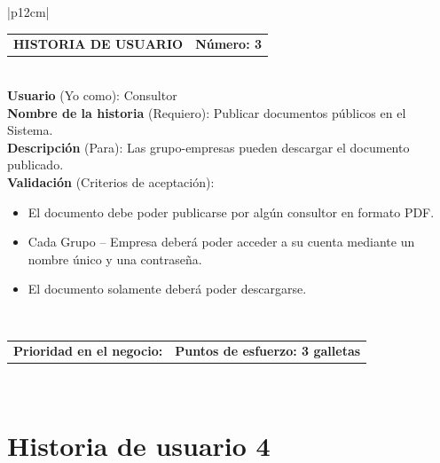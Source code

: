 \documentclass[11pt,letterpaper]{report}
\begin{document}
	\begin{center}	
	\begin{tabular}{|p{12cm}|}
		\hline
		\begin{tabular}{c|c}
			\textbf{HISTORIA DE USUARIO} & \textbf{Número: 3} \\
		\end{tabular} \\ \hline
		\textbf{Usuario} (Yo como): Consultor \\ \hline
		\textbf{Nombre de la historia} (Requiero): Publicar documentos públicos en el Sistema. \\ \hline
		\textbf{Descripción} (Para): Las grupo-empresas pueden descargar el documento publicado. \\ \hline
		\textbf{Validación} (Criterios de aceptación): \\
		\begin{minipage}{12cm}
			\begin{itemize}
				\item El documento debe poder publicarse por algún consultor en formato PDF.
				\item Cada Grupo – Empresa deberá poder acceder a su cuenta mediante un nombre único y una contraseña.
				\item El documento solamente deberá poder descargarse.
			\end{itemize}
		\end{minipage} \\ \hline
		\begin{tabular}{p{6cm}|c}
			\textbf{Prioridad en el negocio: } & \textbf{Puntos de esfuerzo: 3 galletas } \\
		\end{tabular} \\ \hline
	\end{tabular}
	\end{center}
	
	\section{Historia de usuario 4}
	
\end{document}
